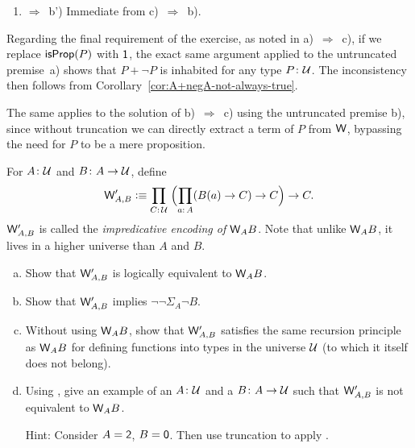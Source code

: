 \begin{solution}
\begin{enumerate}
        \item[c)] $\Rightarrow$~b') Immediate from c)~$\Rightarrow$~b).
        
    \end{enumerate}

    Regarding the final requirement of the exercise, as noted in a)~$\Rightarrow$~c), if we replace $\mathsf{isProp}(P)$ with $\mathsf{1}$, the exact same argument applied to the untruncated premise~a) shows that $P+\neg P$ is inhabited for any type $P\colon\univ$. The inconsistency then follows from Corollary~\ref{cor:A+negA-not-always-true}.

    The same applies to the solution of b)~$\Rightarrow$~c) using the untruncated premise b), since without truncation we can directly extract a term of $P$ from $\mathsf{W}$, bypassing the need for $P$ to be a mere proposition.
\end{solution}

\begin{exr}
    For\/ $A\colon\univ$ and\/ $B\colon A\to\univ$, define
    \[
        \fun W'_{A,B}\defeq
            \prod_{C\colon\univ}\;
            \Bigl(
                \prod_{a\colon A}(B(a)\to C)\to C
            \Bigr)\to C.
    \]
    $\mathsf{W}'_{A,B}$ is called the \textsl{impredicative encoding of\/ $\mathsf{W}_AB$}. Note that unlike\/ $\mathsf{W}_AB$, it lives in a higher universe than\/ $A$ and\/ $B$.
    \begin{enumerate}[a),font=\upshape]
        \item Show that\/ $\mathsf{W}'_{A,B}$ is logically equivalent to\/ $\mathsf{W}_AB$.
        
        \item Show that\/ $\mathsf{W}'_{A,B}$ implies\/ $\neg\neg\Sigma_A\neg B$.
        
        \item Without using\/ $\mathsf{W}_AB$, show that\/ $\mathsf{W}'_{A,B}$ satisfies the same recursion principle as\/ $\mathsf{W}_AB$ for defining functions into types in the universe\/ $\mathcal U$ (to which it itself does not belong).
        
        \item Using \Lem, give an example of an\/ $A\colon\univ$ and a\/ $B\colon A\to\univ$ such that\/ $\mathsf{W}'_{A,B}$ is not equivalent to\/ $\mathsf{W}_AB$.
        
        {\upshape Hint: Consider $A=\mathsf{2}$, $B=\mathsf{0}$. Then use truncation to apply \Lem.}
    \end{enumerate}
\end{exr}

